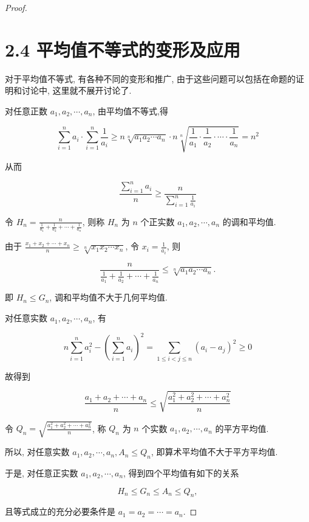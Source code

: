 \begin{proof}
	\section*{2.4 平均值不等式的变形及应用}
	对于平均值不等式, 有各种不同的变形和推广, 由于这些问题可以包括在命题的证明和讨论中, 这里就不展开讨论了.

	对任意正数 $a_{1}, a_{2}, \cdots, a_{n}$, 由平均值不等式,得
	
	$$
	\sum_{i=1}^{n} a_{i} \cdot \sum_{i=1}^{n} \frac{1}{a_{i}} \geqslant n \sqrt[n]{a_{1} a_{2} \cdots a_{n}} \cdot n \sqrt[n]{\frac{1}{a_{1}} \cdot \frac{1}{a_{2}} \cdot \cdots \cdot \frac{1}{a_{n}}}=n^{2}
	$$
	
	从而
	
	$$
	\frac{\sum_{i=1}^{n} a_{i}}{n} \geqslant \frac{n}{\sum_{i=1}^{n} \frac{1}{a_{i}}}
	$$
	
	令 $H_{n}=\frac{n}{\frac{1}{a_{1}}+\frac{1}{a_{2}}+\cdots+\frac{1}{a_{n}}}$, 则称 $H_{n}$ 为 $n$ 个正实数 $a_{1}, a_{2}, \cdots, a_{n}$ 的调和平均值.
	
	由于 $\frac{x_{1}+x_{2}+\cdots+x_{n}}{n} \geqslant \sqrt[n]{x_{1} x_{2} \cdots x_{n}}$, 令 $x_{i}=\frac{1}{a_{i}}$, 则
	
	$$
	\frac{n}{\frac{1}{a_{1}}+\frac{1}{a_{2}}+\cdots+\frac{1}{a_{n}}} \leqslant \sqrt[n]{a_{1} a_{2} \cdots a_{n}} .
	$$
	
	即 $H_{n} \leqslant G_{n}$, 调和平均值不大于几何平均值.
	
	对任意实数 $a_{1}, a_{2}, \cdots, a_{n}$, 有
	
	$$
	n \sum_{i=1}^{n} a_{i}^{2}-\left(\sum_{i=1}^{n} a_{i}\right)^{2}=\sum_{1 \leqslant i<j \leqslant n}\left(a_{i}-a_{j}\right)^{2} \geqslant 0
	$$
	
	故得到
	
	$$
	\frac{a_{1}+a_{2}+\cdots+a_{n}}{n} \leqslant \sqrt{\frac{a_{1}^{2}+a_{2}^{2}+\cdots+a_{n}^{2}}{n}}
	$$
	
	令 $Q_{n}=\sqrt{\frac{a_{1}^{2}+a_{2}^{2}+\cdots+a_{n}^{2}}{n}}$, 称 $Q_{n}$ 为 $n$ 个实数 $a_{1}, a_{2}, \cdots, a_{n}$ 的平方平均值.
	
	所以, 对任意实数 $a_{1}, a_{2}, \cdots, a_{n}, A_{n} \leqslant Q_{n}$, 即算术平均值不大于平方平均值.
	
	于是, 对任意正实数 $a_{1}, a_{2}, \cdots, a_{n}$, 得到四个平均值有如下的关系
	
	$$
	H_{n} \leqslant G_{n} \leqslant A_{n} \leqslant Q_{n},
	$$
	
	且等式成立的充分必要条件是 $a_{1}=a_{2}=\cdots=a_{n}$.



\end{proof}
